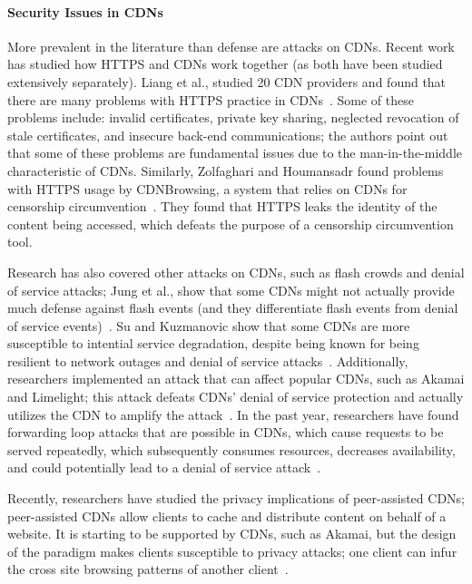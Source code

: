 \paragraph{Security Issues in CDNs} More prevalent in the literature than defense are attacks on CDNs.  Recent work 
has studied how HTTPS and CDNs work together (as both have been studied extensively separately).  Liang et al., studied 
20 CDN providers and found that there are many problems with HTTPS practice in CDNs~\cite{liang2014https}.  Some of these 
problems include: invalid certificates, private key sharing, neglected revocation of stale certificates, and 
insecure back-end communications; the authors point out that some of these problems are fundamental issues due to 
the man-in-the-middle characteristic of CDNs.  Similarly, Zolfaghari and Houmansadr found problems with HTTPS usage by 
CDNBrowsing, a system that relies on CDNs for censorship circumvention~\cite{zolfaghari2016practical}.  They found that HTTPS 
leaks the identity of the content being accessed, which defeats the purpose of a censorship circumvention tool. 

Research has also covered other attacks on CDNs, such as flash crowds and denial of service attacks; Jung et al., show 
that some CDNs might not actually provide much defense against flash events (and they differentiate flash events from denial 
of service events)~\cite{jung2002flash}. Su and Kuzmanovic show that some CDNs are more susceptible to intential service 
degradation, despite being known for being resilient to network outages and denial of service attacks~\cite{su2008thinning}. 
Additionally, researchers implemented an attack that can affect popular CDNs, such as Akamai and Limelight; this attack 
defeats CDNs' denial of service protection and actually utilizes the CDN to amplify the attack~\cite{triukose2009content}.  In the 
past year, researchers have found forwarding loop attacks that are possible in CDNs, which cause requests to be served repeatedly, which 
subsequently consumes resources, decreases availability, and could potentially lead to a denial of service attack~\cite{chen2016forwarding}.

Recently, researchers have studied the privacy implications of peer-assisted CDNs; peer-assisted CDNs allow clients to cache and distribute 
content on behalf of a website.  It is starting to be supported by CDNs, such as Akamai, but the design of the paradigm
makes clients susceptible to privacy attacks; one client can infur the cross site browsing patterns of another client~\cite{jia2016anonymity}.\\

